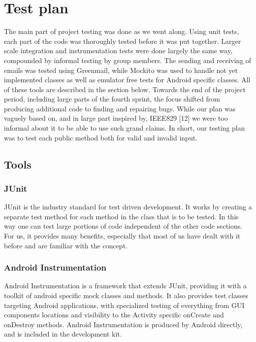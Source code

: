 \section{Test plan}

The main part of project testing was done as we went along. Using unit tests, each part of the code was thoroughly tested before it was put together. Larger scale integration and instrumentation tests were done largely the same way, compounded by informal testing by group members. The sending and receiving of emails was tested using Greenmail, while Mockito was used to handle not yet implemented classes as well as emulator free tests for Android specific classes. All of these tools are described in the section below. Towards the end of the project period, including large parts of the fourth sprint, the focus shifted from producing additional code to finding and repairing bugs. While our plan was vaguely based on, and in large part inspired by, IEEE829 [12] we were too informal about it to be able to use such grand claims. In short, our testing plan was to test each public method both for valid and invalid input.

\subsection{Tools}
\subsubsection{JUnit}
JUnit is the industry standard for test driven development. It works by creating a separate test method for each method in the class that is to be tested. In this way one can test large portions of code independent of the other code sections. For us, it provides many benefits, especially that most of us have dealt with it before and are familiar with the concept.

\subsubsection{Android Instrumentation}
Android Instrumentation is a framework that extends JUnit, providing it with a toolkit of android specific mock classes and methods. It also provides test classes targeting Android applications, with specialized testing of everything from GUI components locations and visibility to the Activity specific onCreate and onDestroy methods. Android Instrumentation is produced by Android directly, and is included in the development kit.

